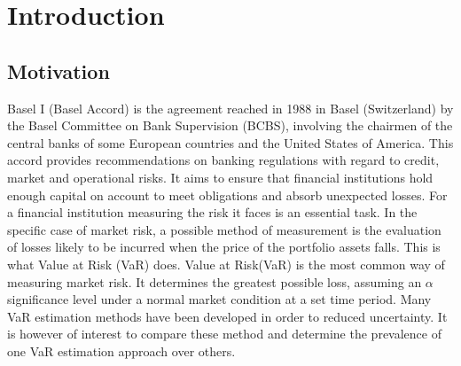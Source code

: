 \documentclass[a4paper,11pt,oneside]{book}
\begin{document}
	
	
	
	\tableofcontents
	



\chapter{Introduction}




\section{Motivation}

Basel I (Basel Accord) is the agreement reached
in 1988 in Basel (Switzerland) by the Basel Committee on Bank
Supervision (BCBS), involving the chairmen of the central banks
of some European countries and
the United States of America. This accord provides recommendations
on banking regulations with regard to credit, market and
operational risks. It aims to ensure that financial institutions
hold enough capital on account to meet obligations and absorb
unexpected losses. \newline\newline
For a financial institution measuring the risk it faces is an essential
task. In the specific case of market risk, a possible method of
measurement is the evaluation of losses likely to be incurred when
the price of the portfolio assets falls. This is what Value at Risk
(VaR) does.\newline\newline
Value at Risk(VaR) is the most common way of measuring market risk. It determines the greatest possible loss, assuming an $\alpha$ significance level under a normal market condition at a set time period.\newline\newline
Many VaR estimation methods have been developed in order to reduced uncertainty. It is however of interest to compare these method and determine the prevalence of one VaR estimation approach over others.
\end{document}
